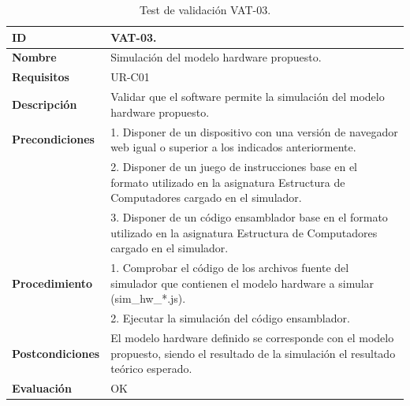 \begin{center}
\begin{table}[htb]
\centering
\begin{tabular}{@{}p{2.5cm} p{9cm}@{}} 
\toprule
\textbf{ID} 					& VAT-03. \\
\midrule
\textbf{Nombre} 				& Simulación del modelo hardware propuesto. \\
\midrule
\textbf{Requisitos} 		& UR-C01 \\
\midrule
\textbf{Descripción} 		& Validar que el software permite la simulación del modelo hardware propuesto. \\
\midrule
\textbf{Precondiciones}		& 1. Disponer de un dispositivo con una versión de navegador web igual o superior a los indicados anteriormente. \\
											& 2. Disponer de un juego de instrucciones base en el formato utilizado en la asignatura Estructura de Computadores cargado en el simulador. \\
											& 3. Disponer de un código ensamblador base en el formato utilizado en la asignatura Estructura de Computadores cargado en el simulador. \\
\midrule
\textbf{Procedimiento}		& 1. Comprobar el código de los archivos fuente del simulador que contienen el modelo hardware a simular (sim\_hw\_*.js).\\
											& 2. Ejecutar la simulación del código ensamblador.\\
\midrule
\textbf{Postcondiciones} 		&  El modelo hardware definido se corresponde con el modelo propuesto, siendo el resultado de la simulación el resultado teórico esperado.\\
\midrule
\textbf{Evaluación} 			& OK \\
\bottomrule
\end{tabular}
\caption{Test de validación VAT-03.}
\label{tab:vat-03}
\end{table}
\end{center}

